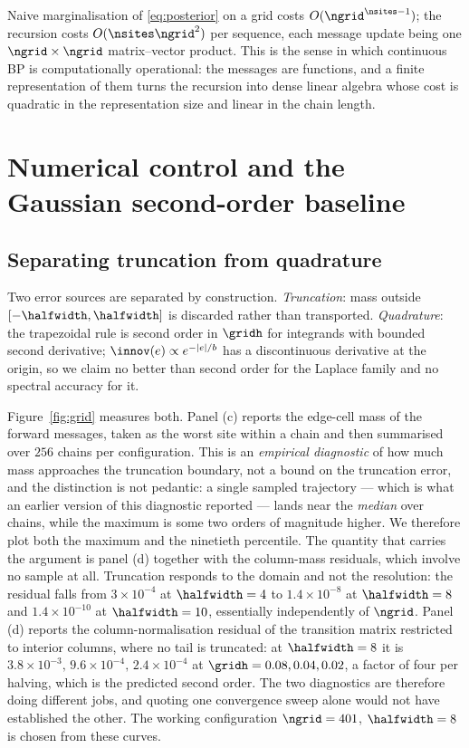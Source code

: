 \documentclass{article}
\begin{document}
Naive marginalisation of \eqref{eq:posterior} on a grid costs $O(\ngrid^{\nsites-1})$; the
recursion costs $O(\nsites\ngrid^2)$ per sequence, each message update being one
$\ngrid\times\ngrid$ matrix--vector product. This is the sense in which continuous BP is
computationally operational: the messages are functions, and a finite representation of them
turns the recursion into dense linear algebra whose cost is quadratic in the representation size
and linear in the chain length.

\section{Numerical control and the Gaussian second-order baseline}
\label{sec:numerics}

\subsection{Separating truncation from quadrature}

Two error sources are separated by construction. \emph{Truncation}: mass outside
$[-\halfwidth,\halfwidth]$ is discarded rather than transported. \emph{Quadrature}: the
trapezoidal rule is second order in $\gridh$ for integrands with bounded second derivative;
$\innov(e)\propto e^{-|e|/b}$ has a discontinuous derivative at the origin, so we claim no
better than second order for the Laplace family and no spectral accuracy for it.

Figure~\ref{fig:grid} measures both. Panel (c) reports the edge-cell mass of the forward
messages, taken as the worst site within a chain and then summarised over $256$ chains per
configuration. This is an \emph{empirical diagnostic} of how much mass approaches the truncation
boundary, not a bound on the truncation error, and the distinction is not pedantic: a single
sampled trajectory --- which is what an earlier version of this diagnostic reported --- lands
near the \emph{median} over chains, while the maximum is some two orders of magnitude higher. We
therefore plot both the maximum and the ninetieth percentile. The quantity that carries the
argument is panel (d) together with the column-mass residuals, which involve no sample at all.
Truncation responds to the domain and not the resolution: the residual falls from
$3\times10^{-4}$ at $\halfwidth=4$ to $1.4\times10^{-8}$ at $\halfwidth=8$ and
$1.4\times10^{-10}$ at $\halfwidth=10$, essentially independently of $\ngrid$.
Panel (d) reports the column-normalisation residual of the transition matrix restricted to
interior columns, where no tail is truncated: at $\halfwidth=8$ it is
$3.8\times10^{-3},\,9.6\times10^{-4},\,2.4\times10^{-4}$ at $\gridh = 0.08, 0.04, 0.02$, a
factor of four per halving, which is the predicted second order. The two diagnostics are
therefore doing different jobs, and quoting one convergence sweep alone would not have
established the other. The working configuration $\ngrid=401$, $\halfwidth=8$ is chosen from
these curves.
\end{document}
